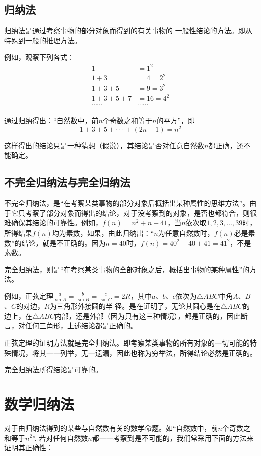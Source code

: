 \subsection{归纳法}
归纳法是通过考察事物的部分对象而得到的有关事物的
一般性结论的方法。即从特殊到一般的推理方法。

例如，观察下列各式：
\[\begin{split}
    1&=1^2\\
1+3&=4=2^2\\
1+3+5&=9=3^2\\
1+3+5+7&=16=4^2\\
\cdots\cdots&\cdots\cdots
\end{split}\]

通过归纳得出：“自然数中，前$n$个奇数之和等于$n$的平方”，即
\[1+3+5+···+(2n-1)=n^2\]

这样得出的结论只是一种猜想（假说），其结论是否对任意自然数$n$都正确，还不能确定。

\subsection{不完全归纳法与完全归纳法}
不完全归纳法，是“在考察某类事物的部分对象后概括出某种属性的思维方法”。由于它只考察了部分对象而得出的结论，对于没考察到的对象，是否也都符合，则很难确保其结论的可靠性。例如，$f(n)=n^2+n+41$，当$n$依次取$1,2,3,\ldots,39$时，所得结果$f(n)$均为素数，如果，由此归纳出：“$n$为任意自然数时，$f(n)$必是素数”的结论，就是不正确的。因为$n=40$时，$f(n)=40^2+40+41=41^2$，不是素数。

完全归纳法，则是“在考察某类事物的全部对象之后，概括出事物的某种属性”的方法。

例如，正弦定理$\frac{a}{\sin A}=\frac{b}{\sin B}=\frac{c}{\sin C}=2R$，其中$a$、$b$、$c$依次为$\triangle ABC$中角$A$、$B$、$C$的对边，$R$为三角形外接圆的半
径。是在证明了，无论其圆心是在$\triangle ABC$的边上，在$\triangle ABC$内部，还是外部（因为只有这三种情况），都是正确的，因此断言，对任何三角形，上述结论都是正确的。

正弦定理的证明方法就是完全归纳法。即考察某类事物的所有对象的一切可能的特殊情况，将其一一列举，无一遗漏，因此也称为穷举法，所得结论必然是正确的。

完全归纳法所得结论是可靠的。

\section{数学归纳法}
对于由归纳法得到的某些与自然数有关的数学命题。如“自然数中，前$n$个奇数之和等于$n^2$”. 若对任何自然数$n$都一一考察到是不可能的，我们常采用下面的方法来证明其正确性：

